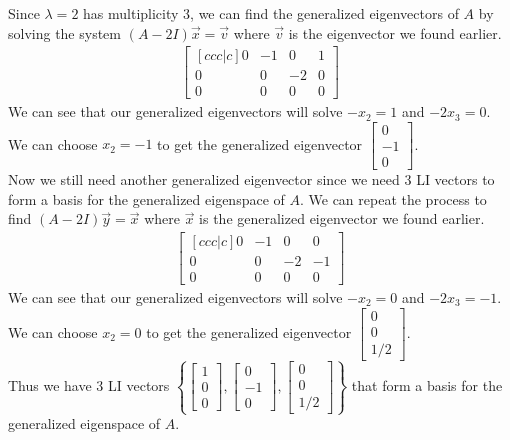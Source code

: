 \documentclass[answers,12pt,addpoints]{exam}
\begin{document}
\begin{questions}
\begin{solution}
            Since $\lambda = 2$ has multiplicity 3, we can find the generalized eigenvectors of $A$ by solving the system $(A - 2I)\vec{x} = \vec{v}$ where $\vec{v}$ is the eigenvector we found earlier.
            \begin{align*}
                \begin{bmatrix}[ccc|c]
                    0 & -1 & 0 & 1 \\
                    0 & 0 & -2 & 0 \\
                    0 & 0 & 0 & 0
                \end{bmatrix}
            \end{align*}
            We can see that our generalized eigenvectors will solve $-x_2 = 1$ and $-2x_3 = 0$. We can choose $x_2 = -1$ to get the generalized eigenvector $\begin{bmatrix} 0\\ -1\\ 0 \end{bmatrix}$. \\
            Now we still need another generalized eigenvector since we need 3 LI vectors to form a basis for the generalized eigenspace of $A$. We can repeat the process to find $(A-2I)\vec{y} = \vec{x}$ where $\vec{x}$ is the generalized eigenvector we found earlier.
            \begin{align*}
                \begin{bmatrix}[ccc|c]
                    0 & -1 & 0 & 0 \\
                    0 & 0 & -2 & -1 \\
                    0 & 0 & 0 & 0
                \end{bmatrix}
            \end{align*}
            We can see that our generalized eigenvectors will solve $-x_2 = 0$ and $-2x_3 = -1$. We can choose $x_2 = 0$ to get the generalized eigenvector $\begin{bmatrix} 0\\ 0\\ 1/2 \end{bmatrix}$. \\
            Thus we have 3 LI vectors $\left\{ \begin{bmatrix} 1\\ 0\\ 0 \end{bmatrix}, \begin{bmatrix} 0\\ -1\\ 0 \end{bmatrix}, \begin{bmatrix} 0\\ 0\\ 1/2 \end{bmatrix} \right\}$ that form a basis for the generalized eigenspace of $A$. \\

\end{solution}
\end{questions}
\end{document}
